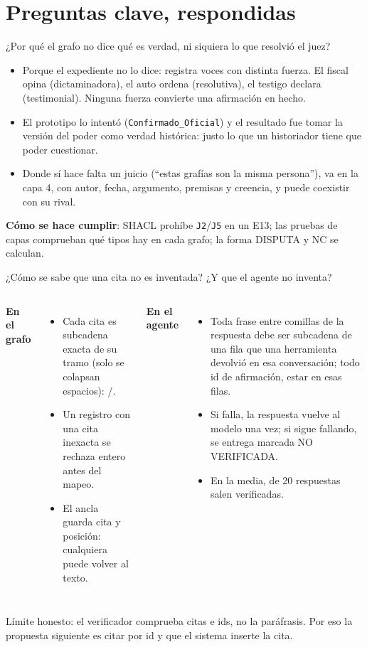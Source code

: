 \documentclass[aspectratio=169,10pt]{beamer}
\newcommand{\ttt}[1]{\texttt{\small #1}}
\begin{document}
\section{Preguntas clave, respondidas}

\begin{frame}{¿Por qué el grafo no dice qué es verdad, ni siquiera lo que resolvió el juez?}
\small
\begin{itemize}
\item Porque el expediente no lo dice: registra \alert{voces con distinta fuerza}. El fiscal opina (dictaminadora), el auto
      ordena (resolutiva), el testigo declara (testimonial). Ninguna fuerza convierte una afirmación en hecho.
\item El prototipo lo intentó (\ttt{Confirmado\_Oficial}) y el resultado fue tomar la versión del poder como verdad
      histórica: justo lo que un historiador tiene que poder cuestionar.
\item Donde sí hace falta un juicio (\enquote{estas grafías son la misma persona}), va en la capa 4, con
      \alert{autor, fecha, argumento, premisas y creencia}, y puede coexistir con su rival.
\end{itemize}
\textbf{Cómo se hace cumplir}: SHACL prohíbe \ttt{J2}/\ttt{J5} en un E13; las pruebas de capas comprueban qué tipos hay en
cada grafo; la forma DISPUTA y NC se calculan.
\end{frame}

\begin{frame}{¿Cómo se sabe que una cita no es inventada? ¿Y que el agente no inventa?}
\begin{columns}[T]
\small
\textbf{En el grafo}
\begin{itemize}\footnotesize
\item Cada cita es subcadena exacta de su tramo (solo se colapsan espacios): \cifraCitas/\cifraCitas.
\item Un registro con una cita inexacta se rechaza entero antes del mapeo.
\item El ancla guarda cita y posición: cualquiera puede volver al texto.
\end{itemize}
\small
\textbf{En el agente}
\begin{itemize}\footnotesize
\item Toda frase entre comillas de la respuesta debe ser subcadena de una fila \alert{que una herramienta devolvió} en esa
      conversación; todo id de afirmación, estar en esas filas.
\item Si falla, la respuesta vuelve al modelo una vez; si sigue fallando, se entrega marcada \alert{NO VERIFICADA}.
\item En la media, \mediaVerificada{} de 20 respuestas salen verificadas.
\end{itemize}
\end{columns}
\medskip
\footnotesize Límite honesto: el verificador comprueba citas e ids, no la paráfrasis. Por eso la propuesta siguiente es
\alert{citar por id} y que el sistema inserte la cita.
\end{frame}
\end{document}
